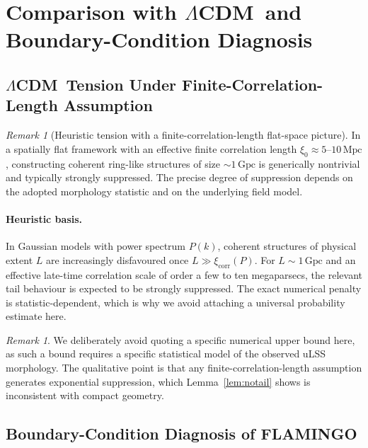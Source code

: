 \documentclass[
  aps,
  prd,
  reprint,
  superscriptaddress,
  nofootinbib,
  longbibliography,
  floatfix,
  amsmath,
  amssymb
]{revtex4-2}
\theoremstyle{plain}
\theoremstyle{definition}
\theoremstyle{remark}
\newtheorem{remark}[theorem]{Remark}
\newcommand{\LCDM}{\ensuremath{\Lambda}CDM}
\begin{document}
\section{Comparison with \LCDM\ and Boundary-Condition Diagnosis}
\label{sec:comparison}

\subsection{\LCDM\ Tension Under Finite-Correlation-Length Assumption}

\begin{remark}[Heuristic tension with a finite-correlation-length flat-space picture]
  \label{prop:tension}
  In a spatially flat framework with an effective finite correlation
  length $\xi_0\approx 5$--$10\,\mathrm{Mpc}$, constructing coherent
  ring-like structures of size $\sim 1\,\mathrm{Gpc}$ is generically
  nontrivial and typically strongly suppressed. The precise degree of
  suppression depends on the adopted morphology statistic and on the
  underlying field model.
\end{remark}
\paragraph{Heuristic basis.}
  In Gaussian models with power spectrum $P(k)$, coherent structures of
  physical extent $L$ are increasingly disfavoured once
  $L\gg \xi_{\mathrm{corr}}(P)$. For $L\sim 1\,\mathrm{Gpc}$ and an
  effective late-time correlation scale of order a few to ten
  megaparsecs, the relevant tail behaviour is expected to be strongly
  suppressed. The exact numerical penalty is statistic-dependent, which
  is why we avoid attaching a universal probability estimate here.

\begin{remark}
  We deliberately avoid quoting a specific numerical upper bound here,
  as such a bound requires a specific statistical model of the observed
  uLSS morphology. The qualitative point is that any finite-correlation-length
  assumption generates exponential suppression, which
  Lemma~\ref{lem:notail} shows is inconsistent with compact geometry.
\end{remark}

\subsection{Boundary-Condition Diagnosis of FLAMINGO}
\end{document}
